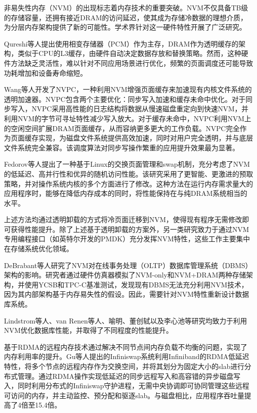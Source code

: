 非易失性内存（NVM）的出现标志着内存技术的重要突破。NVM不仅具备TB级的存储容量，还拥有接近DRAM的访问延迟，使其成为存储冷数据的理想介质，为分层内存架构提供了新的可能性。学术界针对这一硬件特性开展了广泛研究。

Qureshi等人提出使用相变存储器（PCM）作为主存，DRAM作为透明缓存的架构，类似于CPU的L3缓存，由硬件自动决定数据存放和替换策略。然而，这种硬件方法缺乏灵活性，难以针对不同应用场景进行优化，频繁的页面调度还可能导致功耗增加和设备寿命缩短。

Wang等人开发了NVPC，一种利用NVM增强页面缓存来加速现有内核文件系统的透明加速器。NVPC包含两个主要优化：同步写入加速和缓存未命中优化。对于同步写入，NVPC采用高性能的日志结构将数据从慢速磁盘重定向到快速NVM，并利用NVM的字节可寻址特性减少写入放大。对于缓存未命中，NVPC利用NVM上的空闲空间扩展DRAM页面缓存，从而容纳更多更大的工作负载。NVPC完全作为页面缓存实现，为磁盘文件系统提供高效加速，同时对用户完全透明，并与底层文件系统完全兼容。该调度算法对同步写操作繁重的应用提升效果最为显著。

Fedorov等人提出了一种基于Linux的交换页面管理和swap机制，充分考虑了NVM的低延迟、高并行性和优异的随机访问性能。该研究采用了更智能、更激进的预取策略，并对操作系统内核的多个方面进行了修改。这种方法在运行内存需求量大的应用程序时，能够在降低内存成本的同时，将性能保持在与纯DRAM系统相当的水平。

上述方法均通过透明卸载的方式将冷页面迁移到NVM，使得现有程序无需修改即可获得性能提升。除了上述基于透明卸载的方案外，另一类研究致力于通过NVM专用编程接口（如英特尔开发的PMDK）充分发挥NVM特性，这些工作主要集中在存储系统优化领域。

DeBrabant等人研究了NVM对在线事务处理（OLTP）数据库管理系统（DBMS）架构的影响。研究者通过硬件仿真器模拟了NVM-only和NVM+DRAM两种存储架构，并使用YCSB和TPC-C基准测试，发现现有DBMS无法充分利用NVM技术，因为其内部架构基于内存易失性的假设。因此，需要针对NVM特性重新设计数据库系统。

Lindstrom等人、van Renen等人、喻明、董创轼以及李心池等研究均致力于利用NVM优化数据库性能，并取得了不同程度的性能提升。

基于RDMA的远程内存技术通过解决不同节点间内存负载不均衡的问题，实现了内存利用率的提升。Gu等人提出的Infiniswap系统利用Infiniband的RDMA低延迟特性，将多个节点的远程内存作为交换空间，并将其划分为固定大小的slab进行分布式管理。通过RDMA操作实现低延迟的同步远程写入和高容错的异步磁盘写入，同时利用分布式的Infiniswap守护进程，无需中央协调即可协同管理这些远程可访问的内存，并主动监控、预分配和驱逐slab。与磁盘相比，应用程序吞吐量提高了4倍至15.4倍。

